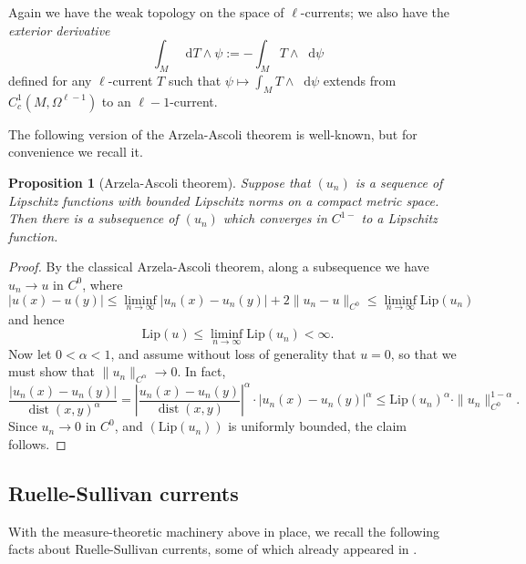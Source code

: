 \documentclass[reqno,11pt]{amsart}
\newcommand*\dif{\mathop{}\!\mathrm{d}}
\DeclareMathOperator{\dist}{dist}
\newcommand{\Lip}{\mathrm{Lip}}
\newcommand{\dfn}[1]{\emph{#1}\index{#1}}
\newtheorem{proposition}[theorem]{Proposition}
\theoremstyle{definition}
\numberwithin{equation}{section}
\begin{document}
Again we have the weak topology on the space of $\ell$-currents; we also have the \dfn{exterior derivative}
$$\int_M \dif T \wedge \psi := -\int_M T \wedge \dif \psi$$
defined for any $\ell$-current $T$ such that $\psi \mapsto \int_M T \wedge \dif \psi$ extends from $C^1_c(M, \Omega^{\ell - 1})$ to an $\ell - 1$-current.

The following version of the Arzela-Ascoli theorem is well-known, but for convenience we recall it.

\begin{proposition}[Arzela-Ascoli theorem]\label{AA Holder}
Suppose that $(u_n)$ is a sequence of Lipschitz functions with bounded Lipschitz norms on a compact metric space. Then there is a subsequence of $(u_n)$ which converges in $C^{1-}$ to a Lipschitz function.
\end{proposition}
\begin{proof}
By the classical Arzela-Ascoli theorem, along a subsequence we have $u_n \to u$ in $C^0$, where
$$|u(x) - u(y)| \leq \liminf_{n \to \infty} |u_n(x) - u_n(y)| + 2 \|u_n - u\|_{C^0} \leq \liminf_{n \to \infty} \Lip(u_n)$$
and hence
$$\Lip(u) \leq \liminf_{n \to \infty} \Lip(u_n) < \infty.$$
Now let $0 < \alpha < 1$, and assume without loss of generality that $u = 0$, so that we must show that $\|u_n\|_{C^\alpha} \to 0$.
In fact,
$$\frac{|u_n(x) - u_n(y)|}{\dist(x, y)^\alpha} = \left|\frac{u_n(x) - u_n(y)}{\dist(x, y)}\right|^\alpha \cdot |u_n(x) - u_n(y)|^\alpha \leq \Lip(u_n)^\alpha \cdot \|u_n\|_{C^0}^{1 - \alpha}.$$
Since $u_n \to 0$ in $C^0$, and $(\Lip(u_n))$ is uniformly bounded, the claim follows.
\end{proof}

\subsection{Ruelle-Sullivan currents}
With the measure-theoretic machinery above in place, we recall the following facts about Ruelle-Sullivan currents, some of which already appeared in \cite[\S8]{daskalopoulos2020transverse}.
\end{document}
